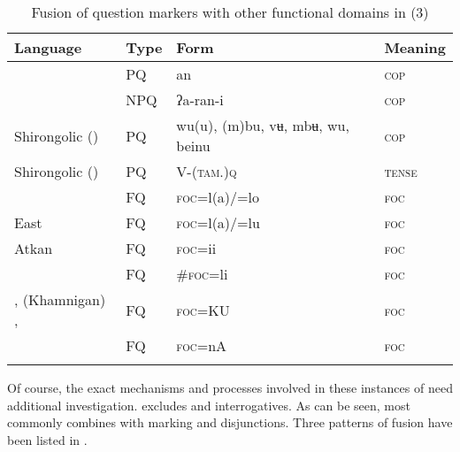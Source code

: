 \begin{table}
\caption{Fusion of question markers with other functional domains in  (3)}
\label{tab:6:4}

\begin{tabularx}{\textwidth}{QlQl}
\lsptoprule

\textbf{Language} & \textbf{Type} & \textbf{Form} & \textbf{Meaning}\\
\midrule
{} & PQ & an & \textsc{cop}\\
 & NPQ & ʔa-ran-i & \textsc{cop}\\
Shirongolic () & PQ &  wu(u), (m)bu,  vʉ, mbʉ,  wu,  beinu & \textsc{cop}\\
Shirongolic () & PQ & V-(\textsc{tam}.)\textsc{q} & \textsc{tense}\\
  & FQ & \textsc{foc}=l(a)/=lo & \textsc{foc}\\
East   & FQ & \textsc{foc}=l(a)/=lu & \textsc{foc}\\
Atkan  & FQ & \textsc{foc}=ii & \textsc{foc}\\
 & FQ & \#\textsc{foc}=li & \textsc{foc}\\
, (Khamnigan) ,  & FQ & \textsc{foc}=KU & \textsc{foc}\\
 & FQ & \textsc{foc}=nA & \textsc{foc}\\
\lspbottomrule
\end{tabularx}
\end{table}

Of course, the exact mechanisms and processes involved in these instances of  need additional investigation.  excludes  and interrogatives. As can be seen,  most commonly combines with  marking and disjunctions. Three patterns of fusion have been listed in .

